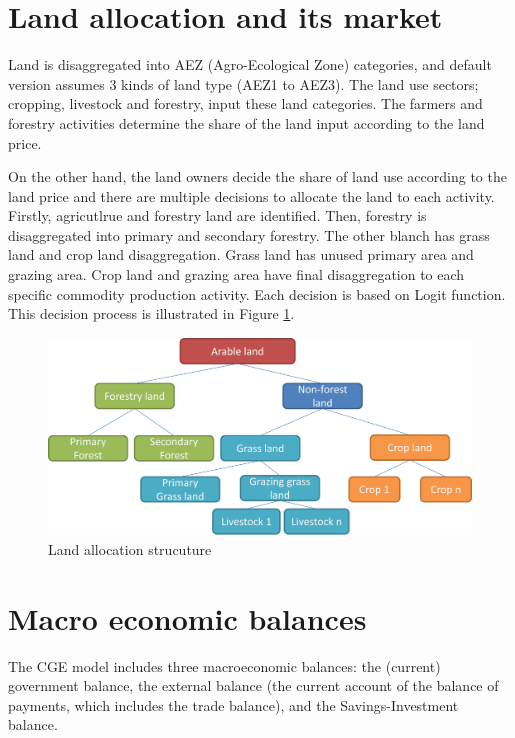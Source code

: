 \documentclass[10pt,a4paper,titlepage,dvipdfmx]{book}
\begin{document}
\section{\label{sec:LanAlloMar}Land allocation and its market}

Land is disaggregated into AEZ (Agro-Ecological Zone) categories, and default version assumes 3 kinds of land type (AEZ1 to AEZ3). The land use sectors; cropping, livestock and forestry, input these land categories. The farmers and forestry activities determine the share of the land input according to the land price. 

On the other hand, the land owners decide the share of land use according to the land price and there are multiple decisions to allocate the land to each activity. Firstly, agricutlrue and forestry land are identified. Then, forestry is disaggregated into primary and secondary forestry. The other blanch has grass land and crop land disaggregation. Grass land has unused primary area and grazing area. Crop land and grazing area have final disaggregation to each specific commodity production activity. Each decision is based on Logit function. This decision process is illustrated in Figure \ref{fig:LandAll}.
\begin{figure}
\includegraphics[width=1\textwidth]{fig/image6.png}
\caption{\label{fig:LandAll}Land allocation strucuture}
\end{figure}

\section{\label{sec:MacEcoBala}Macro economic balances}

The CGE model includes three macroeconomic balances: the (current) government balance, the external balance (the current account of the balance of payments, which includes the trade balance), and the Savings-Investment balance.
\end{document}

